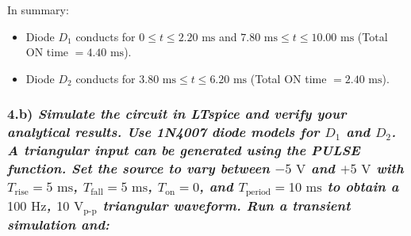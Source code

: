 \noindent In summary:
\begin{itemize}
    \item Diode $D_1$ conducts for $0 \le t \le 2.20\text{ ms}$ and $7.80\text{ ms} \le t \le 10.00\text{ ms}$ (Total ON time $= 4.40\text{ ms}$).
    \item Diode $D_2$ conducts for $3.80\text{ ms} \le t \le 6.20\text{ ms}$ (Total ON time $= 2.40\text{ ms}$).
\end{itemize}

\clearpage
\subsubsection*{4.b) \normalfont\itshape Simulate the circuit in LTspice and verify your analytical results. Use 1N4007 diode models for $D_1$ and $D_2$. A triangular input can be generated using the PULSE function. Set the source to vary between $-5\text{ V}$ and $+5\text{ V}$ with $T_{\text{rise}} = 5\text{ ms}$, $T_{\text{fall}} = 5\text{ ms}$, $T_{\text{on}} = 0$, and $T_{\text{period}} = 10\text{ ms}$ to obtain a $100\text{ Hz}$, $10\text{ V}_{\text{p-p}}$ triangular waveform. Run a transient simulation and:}

